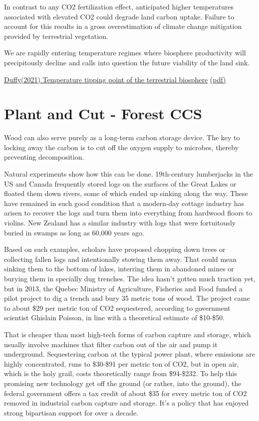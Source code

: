 \documentclass[
]{book}
\begin{document}
In contrast to any CO2 fertilization effect,
anticipated higher temperatures associated with
elevated CO2 could degrade land carbon uptake.
Failure to account for this results in
a gross overestimation of climate change mitigation provided by terrestrial vegetation.

We are rapidly entering temperature regimes where biosphere productivity
will precipitously decline and
calls into question the future viability of the land sink.

\href{https://advances.sciencemag.org/content/7/3/eaay1052}{Duffy(2021) Temperature tipping point of the terrestrial biosphere}
\href{pdf/Duffy_2020_Temperature_Tipping_Point.pdf}{(pdf)}

\hypertarget{plant-and-cut---forest-ccs}{%
\section{Plant and Cut - Forest CCS}\label{plant-and-cut---forest-ccs}}

Wood can also serve purely as a long-term carbon storage device. The key to locking away the carbon is to cut off the oxygen supply to microbes, thereby preventing decomposition.

Natural experiments show how this can be done. 19th-century lumberjacks in the US and Canada frequently stored logs on the surfaces of the Great Lakes or floated them down rivers, some of which ended up sinking along the way. These have remained in such good condition that a modern-day cottage industry has arisen to recover the logs and turn them into everything from hardwood floors to violins. New Zealand has a similar industry with logs that were fortuitously buried in swamps as long as 60,000 years ago.

Based on such examples, scholars have proposed chopping down trees or collecting fallen logs and intentionally stowing them away. That could mean sinking them to the bottom of lakes, interring them in abandoned mines or burying them in specially dug trenches.
The idea hasn't gotten much traction yet, but in 2013, the Quebec Ministry of Agriculture, Fisheries and Food funded a pilot project to dig a trench and bury 35 metric tons of wood. The project came to about \$29 per metric ton of CO2 sequestered, according to government scientist Ghislain Poisson, in line with a theoretical estimate of \$10-\$50.

That is cheaper than most high-tech forms of carbon capture and storage, which usually involve machines that filter carbon out of the air and pump it underground. Sequestering carbon at the typical power plant, where emissions are highly concentrated, runs to \$30-\$91 per metric ton of CO2, but in open air, which is the holy grail, costs theoretically range from \$94-\$232. To help this promising new technology get off the ground (or rather, into the ground), the federal government offers a tax credit of about \$35 for every metric ton of CO2 removed in industrial carbon capture and storage. It's a policy that has enjoyed strong bipartisan support for over a decade.
\end{document}

